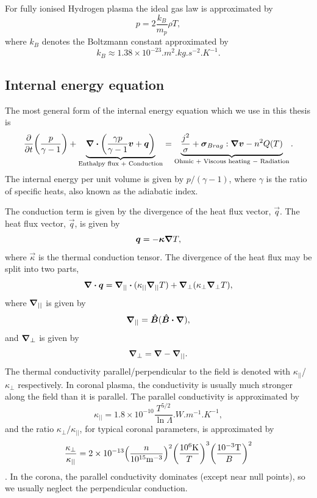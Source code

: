 For fully ionised Hydrogen plasma the ideal gas law is approximated by
\begin{equation}
    \label{eq:ideal_gas_law}
    p=2\frac{k_B}{m_p}\rho T,
\end{equation}
where $k_B$ denotes the Boltzmann constant approximated by 
\[k_B\approx1.38 \times 10^{-23}\si{.m^2.kg.s^{-2}.K^{-1}}.\]

\subsection{Internal energy equation}
\label{sec:internal_energy_equation}

The most general form of the internal energy equation which we use in this thesis is
\begin{equation}
    \label{eq:internal_energy}
    \pdv{}{t}\qty(\frac{p}{\gamma - 1})+\underbrace{\div(\frac{\gamma p}{\gamma - 1}\boldsymbol{v}+\boldsymbol{q})}_{\text{Enthalpy flux + Conduction}}=\underbrace{\frac{j^2}{\sigma}+\boldsymbol{\sigma}_{Brag}:\grad \boldsymbol{v}-n^2Q(T)}_{\text{Ohmic + Viscous heating $-$ Radiation}}.
\end{equation}
The internal energy per unit volume is given by $p/(\gamma - 1)$, where $\gamma$ is the ratio of specific heats, also known as the adiabatic index.

The conduction term is given by the divergence of the heat flux vector, $\vec{q}$. The heat flux vector, $\vec{q}$, is given by
\begin{equation}
    \boldsymbol{q}=-\boldsymbol{\kappa}\grad T,
\end{equation}
where $\vec{\kappa}$ is the thermal conduction tensor. The divergence of the heat flux may be split into two parts,
\begin{equation}
    \div\vec{q}=\grad_{||}\vdot(\kappa_{||}\grad_{||}T)+\grad_{\perp}(\kappa_\perp\grad_\perp T),
\end{equation}
where $\grad_{||}$ is given by
\begin{equation}
    \grad_{||}=\vec{\hat{B}}(\vec{\hat{B}}\vdot\grad),
\end{equation}
and $\grad_\perp$ is given by
\begin{equation}
    \grad_\perp = \grad - \grad_{||}.
\end{equation}
The thermal conductivity parallel/perpendicular to the field is denoted with $\kappa_{||}$/$\kappa_\perp$ respectively. In coronal plasma, the conductivity is usually much stronger along the field than it is parallel. The parallel conductivity is approximated by
\begin{equation}
    \kappa_{||}=1.8\times10^{-10}\frac{T^{5/2}}{\ln\Lambda}\si{.W.m^{-1}.K^{-1}},
\end{equation}
and the ratio $\kappa_\perp/\kappa_{||}$, for typical coronal parameters, is approximated by
\begin{equation}
    \frac{\kappa_\perp}{\kappa_{||}}=2\times10^{-13}\qty(\frac{n}{10^{15}\si{.m^{-3}}})^2\qty(\frac{10^6\si{.K}}{T})^3\qty(\frac{10^{-3}\si{.T}}{B})^2
\end{equation}
\citep{Spitzer1965, Braginskii1965, Priest2014}. In the corona, the parallel conductivity dominates (except near null points), so we usually neglect the perpendicular conduction.

